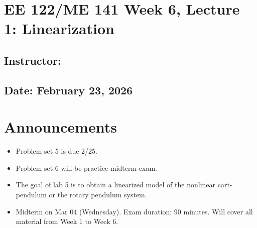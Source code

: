 \documentclass{ee122_notes}
\renewcommand{\releasedate}{February 23, 2026}
\begin{document}
\section*{EE 122/ME 141 Week 6, Lecture 1: Linearization}
\subsection*{Instructor: \instructor}
\subsection*{Date: \releasedate}
\section{Announcements}
\begin{itemize}
    \item Problem set 5 is due 2/25.
    \item Problem set 6 will be practice midterm exam. 
    \item The goal of lab 5 is to obtain a linearized model of the nonlinear cart-pendulum or the rotary pendulum system. 
    \item Midterm on Mar 04 (Wednesday). Exam duration: 90 minutes. Will cover all material from Week 1 to Week 6.
\end{itemize}
\end{document}
